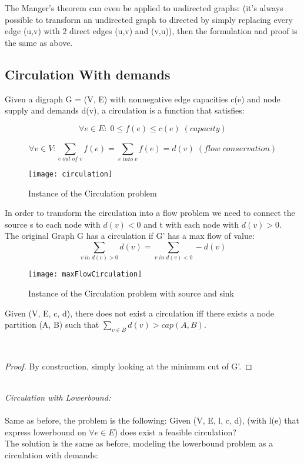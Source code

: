 The Manger's theorem can even be applied to undirected graphs: (it's always possible to transform an undirected graph to directed by simply replacing every edge (u,v) with 2 direct edges (u,v) and (v,u)), then the formulation and proof is the same as above.

\subsection{Circulation With demands}
Given a digraph G = (V, E) with nonnegative edge capacities c(e) and node supply and demands d(v), a circulation is a function that satisfies:

\[ \forall e \in E: \; 0 \leq f(e) \leq c(e) \; (capacity)\]

\[ \forall v \in V: \sum_{e \; out \; of \; v}^{} f(e) = \sum_{e \; into \; v}^{} f(e) = d(v) \; (flow \; conservation)\]

\begin{figure}[H]
    \centering
    \texttt{[image: circulation]}
    \caption{Instance of the Circulation problem}
\end{figure}

In order to transform the circulation into a flow problem we need to connect the source s to each node with $d(v) < 0$ and t with each node with $d(v) > 0$.\\
The original Graph G has a circulation if G' has a max flow of value:
\[ \sum _{v \: in \; d(v) > 0 } d(v) = \sum _{v \; in \; d(v) < 0} - d(v)\]

\begin{figure}[H]
    \centering
    \texttt{[image: maxFlowCirculation]}
    \caption{Instance of the Circulation problem with source and sink}
\end{figure}

\begin{claim}
    Given (V, E, c, d), there does not exist a circulation iff there exists a node partition (A, B) such that $\sum _{v \in B} d(v) > cap(A, B).$
\end{claim}\\

\begin{proof}
    By construction, simply looking at the minimum cut of G'.
\end{proof}\\

\emph{Circulation with Lowerbound:}\\\\
Same as before, the problem is the following: Given (V, E, l, c, d), (with l(e) that express lowerbound on $\forall e \in E$) does exist a feasible circulation?\\
The solution is the same as before, modeling the lowerbound problem as a circulation with demands:

